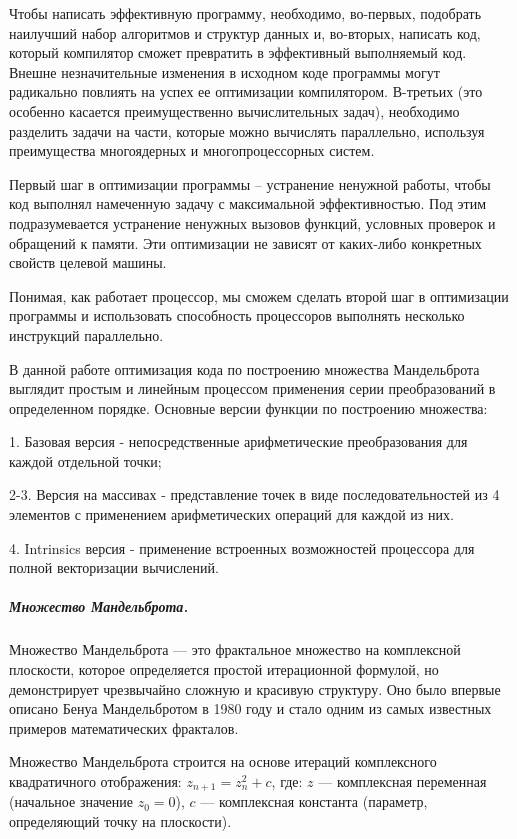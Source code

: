 \documentclass[12pt, letterpaper]{article}
\begin{document}
    Чтобы написать эффективную программу, необходимо, во-первых, подобрать наилучший набор алгоритмов и структур данных и, во-вторых, написать код, который компилятор сможет превратить в эффективный выполняемый код. Внешне незначительные изменения в исходном коде программы могут радикально повлиять на успех ее оптимизации компилятором. В-третьих (это особенно касается преимущественно вычислительных задач), необходимо разделить задачи на части, которые можно вычислять параллельно, используя преимущества многоядерных и многопроцессорных систем.

    Первый шаг в оптимизации программы – устранение ненужной работы, чтобы код выполнял намеченную задачу с максимальной эффективностью. Под этим подразумевается устранение ненужных вызовов функций, условных проверок и обращений к памяти. Эти оптимизации не зависят от каких-либо конкретных свойств целевой машины.

    Понимая, как работает процессор, мы сможем сделать второй шаг в оптимизации программы и использовать способность процессоров выполнять несколько инструкций параллельно.

    В данной работе оптимизация кода по построению множества Мандельброта выглядит простым и линейным процессом применения серии преобразований в определенном порядке. Основные версии функции по построению множества:

    1. Базовая версия - непосредственные арифметические преобразования для каждой отдельной точки;

    2-3. Версия на массивах - представление точек в виде последовательностей из 4 элементов с применением арифметических операций для каждой из них.

    4. Intrinsics версия - применение встроенных возможностей процессора для полной векторизации вычислений.

    \subparagraph{Множество Мандельброта.}
    Множество Мандельброта — это фрактальное множество на комплексной плоскости, которое определяется простой итерационной формулой, но демонстрирует чрезвычайно сложную и красивую структуру. Оно было впервые описано Бенуа Мандельбротом в 1980 году и стало одним из самых известных примеров математических фракталов.

    Множество Мандельброта строится на основе итераций комплексного квадратичного отображения: $z_{n+1} = z_{n}^2 + c$, где:
    $z$ — комплексная переменная (начальное значение $z_0 = 0$), $c$ — комплексная константа (параметр, определяющий точку на плоскости).
\end{document}
